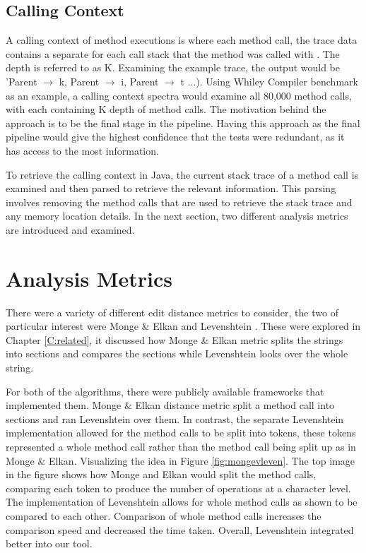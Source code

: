 \subsection{Calling Context}
A calling context of method executions is where each method call, the trace data contains a separate  for each call stack that the method was called with \cite{callingcontext}. The depth is referred to as K. Examining the example trace, the output would be 'Parent $\rightarrow$ k, Parent $\rightarrow$ i, Parent $\rightarrow$ t ...). Using Whiley Compiler benchmark as an example, a calling context spectra would examine all 80,000 method calls, with each containing K depth of method calls. The motivation behind the approach is to be the final stage in the pipeline. Having this approach as the final pipeline would give the highest confidence that the tests were redundant, as it has access to the most information.

To retrieve the calling context in Java, the current stack trace of a method call is examined and then parsed to retrieve the relevant information. This parsing involves removing the method calls that are used to retrieve the stack trace and any memory location details.  In the next section, two different analysis metrics are introduced and examined.

\section{Analysis Metrics}
\label{S:metrics}

There were a variety of different edit distance metrics to consider, the two of particular interest were Monge \& Elkan \cite{monge1997efficient} and Levenshtein \cite{levenshtein1966binary}. These were explored in Chapter \ref{C:related}, it discussed how Monge \& Elkan metric splits the strings into sections and compares the sections while Levenshtein looks over the whole string. 

For both of the algorithms, there were publicly available frameworks that implemented them. Monge \& Elkan distance metric split a method call into sections and ran Levenshtein over them. In contrast, the separate Levenshtein implementation allowed for the method calls to be split into tokens, these tokens represented a whole method call rather than the method call being split up as in Monge \& Elkan. Visualizing the idea in Figure \ref{fig:mongevleven}. The top image in the figure shows how Monge and Elkan would split the method calls, comparing each token to produce the number of operations at a character level. The implementation of Levenshtein allows for whole method calls as shown to be compared to each other. Comparison of whole method calls increases the comparison speed and decreased the time taken. Overall, Levenshtein integrated better into our tool.

